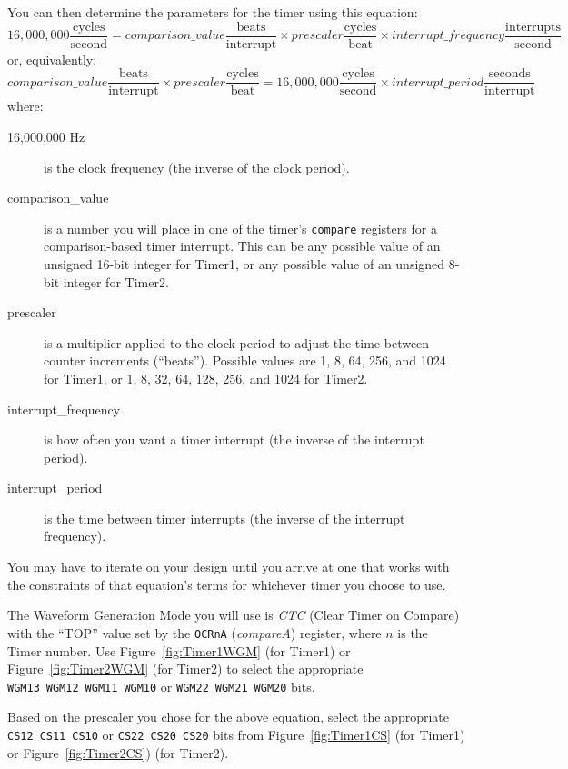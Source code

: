 You can then determine the parameters for the timer using
this equation:
\[
16,000,000 \frac{\mathrm{cycles}}{\mathrm{second}} =
    comparison\_value \frac{\mathrm{beats}}{\mathrm{interrupt}} \times
    prescaler \frac{\mathrm{cycles}}{\mathrm{beat}} \times
    interrupt\_frequency \frac{\mathrm{interrupts}}{\mathrm{second}}
\]
or, equivalently:
\[
    comparison\_value \frac{\mathrm{beats}}{\mathrm{interrupt}} \times
    prescaler \frac{\mathrm{cycles}}{\mathrm{beat}} =
    16,000,000 \frac{\mathrm{cycles}}{\mathrm{second}} \times
    interrupt\_period \frac{\mathrm{seconds}}{\mathrm{interrupt}}
\]
where:
    \begin{description}
    \item [16,000,000 Hz] is the clock frequency (the inverse of the clock
        period).
    \item [comparison\_value] is a number you will place in one of the
        timer's \texttt{compare} registers for a comparison-based timer
        interrupt. This can be any possible value of an unsigned 16-bit integer
        for Timer1, or any possible value of an unsigned 8-bit integer for
        Timer2.
    \item [prescaler] is a multiplier applied to the clock period to adjust the
        time between counter increments (``beats''). Possible values are 1, 8,
        64, 256, and 1024 for Timer1, or 1, 8, 32, 64, 128, 256, and 1024 for
        Timer2.
    \item [interrupt\_frequency] is how often you want a timer interrupt (the
        inverse of the interrupt period).
    \item [interrupt\_period] is the time between timer interrupts (the
        inverse of the interrupt frequency).
    \end{description}

You may have to iterate on your design until you arrive at one that works with
the constraints of that equation's terms for whichever timer you choose to use.

The Waveform Generation Mode you will use is \textit{CTC} (Clear Timer on
Compare) with the ``TOP'' value set by the \texttt{OCRnA} (\textit{compareA})
register, where $n$ is the Timer number. Use Figure~\ref{fig:Timer1WGM} (for
Timer1) or Figure~\ref{fig:Timer2WGM} (for Timer2) to select the appropriate
\texttt{WGM13}~\texttt{WGM12}~\texttt{WGM11}~\texttt{WGM10} or
\texttt{WGM22}~\texttt{WGM21}~\texttt{WGM20} bits.

Based on the prescaler you chose for the above equation, select the appropriate
\texttt{CS12}~\texttt{CS11}~\texttt{CS10} or
\texttt{CS22}~\texttt{CS20}~\texttt{CS20} bits from Figure~\ref{fig:Timer1CS}
(for Timer1) or Figure~\ref{fig:Timer2CS}) (for Timer2).

